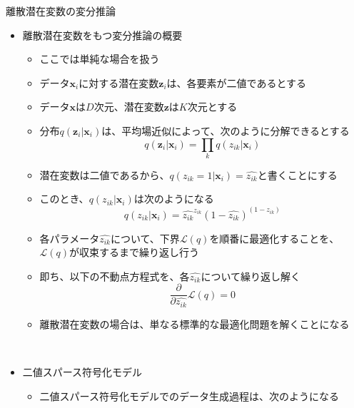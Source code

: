 \documentclass[dvipdfmx,notheorems,t]{beamer}
\begin{document}
\begin{frame}{離散潜在変数の変分推論}

\begin{itemize}
	\item 離散潜在変数をもつ変分推論の概要
	\begin{itemize}
		\item ここでは単純な場合を扱う
		\item データ$\bm{x}_i$に対する潜在変数$\bm{z}_i$は、\alert{各要素が二値である}とする
		\item データ$\bm{x}$は$D$次元、潜在変数$\bm{z}$は$K$次元とする
		\newline
		\item 分布$q(\bm{z}_i | \bm{x}_i)$は、平均場近似によって、次のように分解できるとする
		\begin{equation}
			q(\bm{z}_i | \bm{x}_i) = \prod_k q(z_{ik} | \bm{x}_i)
		\end{equation}
		
		\item 潜在変数は二値であるから、\color{red}$q(z_{ik} = 1 | \bm{x}_i) = \widehat{z_{ik}}$\normalcolor と書くことにする
		\item このとき、$q(z_{ik} | \bm{x}_i)$は次のようになる
		\begin{equation}
			q(z_{ik} | \bm{x}_i) = \widehat{z_{ik}}^{z_{ik}} \left( 1 - \widehat{z_{ik}} \right)^{\left( 1 - z_{ik} \right)}
		\end{equation}
		
		\item 各パラメータ$\widehat{z_{ik}}$について、下界$\mathcal{L}(q)$を順番に最適化することを、$\mathcal{L}(q)$が収束するまで繰り返し行う
		\item 即ち、以下の不動点方程式を、各$\widehat{z_{ik}}$について繰り返し解く
		\begin{equation}
			\frac{\partial}{\partial \widehat{z_{ik}}} \mathcal{L}(q) = 0
		\end{equation}
		
		\item 離散潜在変数の場合は、単なる標準的な最適化問題を解くことになる
	\end{itemize} \
	
	\item 二値スパース符号化モデル
	\begin{itemize}
		\item 二値スパース符号化モデルでのデータ生成過程は、次のようになる
		\newline
		

\end{itemize}
\end{itemize}
\end{frame}
\end{document}
